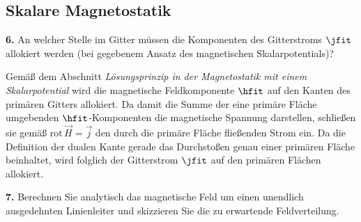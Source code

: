 \documentclass[./Protokollheft.tex]{subfiles}
\begin{document}
\newpage
%
{\subsection{Skalare Magnetostatik}}

\begin{framed}
	\noindent \textbf{6.} An welcher Stelle im Gitter müssen die Komponenten des Gitterstroms
$\jfit$ allokiert werden (bei gegebenem Ansatz des magnetischen Skalarpotentials)?\label{exer:allocateCurrent}
\end{framed}

Gemäß dem Abschnitt \textit{Lösungsprinzip in der Magnetostatik mit einem Skalarpotential} wird die magnetische Feldkomponente $ \hfit $ auf den Kanten des primären Gitters allokiert. Da damit die Summe der eine primäre Fläche umgebenden $ \hfit $-Komponenten die magnetische Spannung darstellen, schließen sie gemäß $ \mathrm{rot} \, \vec{H} = \vec{j}$ den durch die primäre Fläche fließenden Strom ein. Da die Definition der dualen Kante gerade das Durchstoßen genau einer primären Fläche beinhaltet, wird folglich der Gitterstrom $ \jfit $ auf den primären Flächen allokiert.

\begin{framed}
	\noindent \textbf{7.} Berechnen Sie analytisch das magnetische Feld um einen unendlich
ausgedehnten Linienleiter und skizzieren Sie die zu erwartende
Feldverteilung.\label{exer:HfieldAroundLineConductor}
\end{framed}
\end{document}
